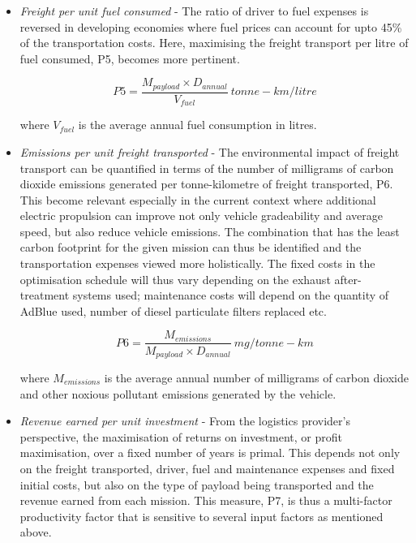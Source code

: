 \documentclass[ExampleMasters.tex]{subfiles}
\begin{document}
\begin{itemize}
			\item \textit{Freight per unit fuel consumed} - The ratio of driver to fuel expenses is reversed in developing economies where fuel prices can account for upto 45\% of the transportation costs. Here, maximising the freight transport per litre of fuel consumed, P5, becomes more pertinent.
			
			\begin{equation}
				P5 = \frac{M_{payload} \times D_{annual}}{V_{fuel}} \ tonne-km/litre
			\end{equation}

			where $V_{fuel}$  is the average annual fuel consumption in litres.\\

			\item \textit{Emissions per unit freight transported} - The environmental impact of freight transport can be quantified in terms of the number of milligrams of carbon dioxide emissions generated per tonne-kilometre of freight transported, P6. This become relevant especially in the current context where additional electric propulsion can improve not only vehicle gradeability and average speed, but also reduce vehicle emissions. The combination that has the least carbon footprint for the given mission can thus be identified and the transportation expenses viewed more holistically. The fixed costs in the optimisation schedule will thus vary depending on the exhaust after-treatment systems used; maintenance costs will depend on the quantity of AdBlue used, number of diesel particulate filters replaced etc.

			\begin{equation}
				P6 = \frac{M_{emissions}}{M_{payload} \times D_{annual}}\  mg/tonne-km
			\end{equation}

			where $M_{emissions}$  is the average annual number of milligrams of carbon dioxide and other noxious pollutant emissions generated by the vehicle.

			\item \textit{Revenue earned per unit investment} - From the logistics provider's perspective, the maximisation of returns on investment, or profit maximisation, over a fixed number of years is primal. This depends not only on the freight transported, driver, fuel and maintenance expenses and fixed initial costs, but also on the type of payload being transported and the revenue earned from each mission. This measure, P7, is thus a multi-factor productivity factor that is sensitive to several input factors as mentioned above.


\end{itemize}
\end{document}
